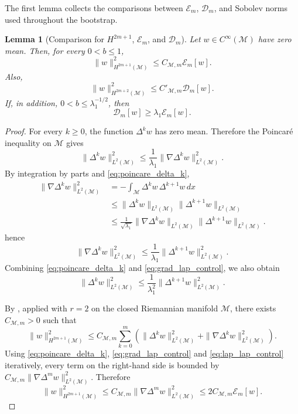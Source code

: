 \documentclass[11pt]{article}
\newtheorem{lemma}[theorem]{Lemma}
\theoremstyle{definition}
\def\M{\mathcal M}
\begin{document}
The first lemma collects the comparisons between $\mathcal E_m$, $\mathcal D_m$,
and Sobolev norms used throughout the bootstrap.
\begin{lemma}[Comparison for $H^{2m+1}$, $\mathcal E_m$, and $\mathcal D_m$]\label{lem:sobolev_control}
Let $w \in C^\infty( \M)$ have zero mean. Then, for every $0 < b \le 1$,
\[
\|w\|_{H^{2m+1}( \M)}^2
\le
C_{ \M,m}\mathcal E_m[w].
\]
Also,
\[
\|w\|_{H^{2m+2}( \M)}^2
\le
C'_{ \M,m}\mathcal D_m[w].
\]
If, in addition, $0 < b \le \lambda_1^{-1/2}$, then
\begin{equation}\label{eq:conditional_coercivity}
\mathcal D_m[w] \ge  \lambda_1\mathcal E_m[w].
\end{equation}
\end{lemma}

\begin{proof}
For every $k\ge0$, the function $\Delta^k w$ has zero mean. Therefore the Poincar\'e inequality on  $\M$ gives
\begin{equation}\label{eq:poincare_delta_k}
\|\Delta^k w\|_{L^2( \M)}^2
\le
\frac{1}{ \lambda_1}\|\nabla \Delta^k w\|_{L^2( \M)}^2.
\end{equation}
By integration by parts and \eqref{eq:poincare_delta_k},
\begin{align*}
\|\nabla \Delta^k w\|_{L^2( \M)}^2
&=
-\int_{ \M}\Delta^k w\,\Delta^{k+1} w\, dx \\
&\le
\|\Delta^k w\|_{L^2( \M)}\|\Delta^{k+1}w\|_{L^2( \M)} \\
&\le
\frac{1}{\sqrt{ \lambda_1}}\|\nabla \Delta^k w\|_{L^2( \M)}
\|\Delta^{k+1}w\|_{L^2( \M)}.
\end{align*}
hence
\begin{equation}\label{eq:grad_lap_control}
\|\nabla \Delta^k w\|_{L^2( \M)}^2
\le
\frac{1}{ \lambda_1}\|\Delta^{k+1}w\|_{L^2( \M)}^2.
\end{equation}
Combining \eqref{eq:poincare_delta_k} and \eqref{eq:grad_lap_control}, we also obtain
\begin{equation}\label{eq:lap_lap_control}
\|\Delta^k w\|_{L^2( \M)}^2
\le
\frac{1}{ \lambda_1^2}\|\Delta^{k+1}w\|_{L^2( \M)}^2.
\end{equation}

By \cite[Corollary~3.1]{xu2004spectral}, applied with $r=2$ on the closed Riemannian manifold  $\M$, there exists $C_{ \M,m}>0$ such that
\[
\|w\|_{H^{2m+1}( \M)}^2
\le
C_{ \M,m}\sum_{k=0}^m
\left(
\|\Delta^k w\|_{L^2( \M)}^2
+
\|\nabla\Delta^k w\|_{L^2( \M)}^2
\right).
\]
Using \eqref{eq:poincare_delta_k}, \eqref{eq:grad_lap_control} and \eqref{eq:lap_lap_control} iteratively, every term on the right-hand side is bounded by $C_{ \M,m}\|\nabla\Delta^m w\|_{L^2( \M)}^2$. Therefore
\[
\|w\|_{H^{2m+1}( \M)}^2
\le
C_{ \M,m}\|\nabla\Delta^m w\|_{L^2( \M)}^2
\le
2C_{ \M,m}\mathcal E_m[w].
\]


\end{proof}
\end{document}
